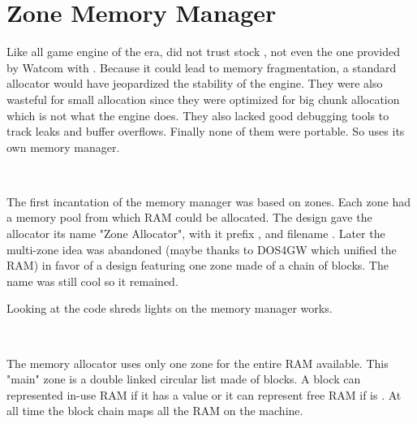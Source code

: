 \section{Zone Memory Manager}
Like all game engine of the era, \doom{} did not trust stock , not even the one provided by Watcom with . Because it could lead to memory fragmentation, a standard allocator would have jeopardized the stability of the engine. They were also wasteful for small allocation since they were optimized for big chunk allocation which is not what the engine does. They also lacked good debugging tools to track leaks and buffer overflows. Finally none of them were portable. So \doom{} uses its own memory manager.\\
\par

\\
\par
The first incantation of the memory manager was based on zones. Each zone had a memory pool from which RAM could be allocated. The design gave the allocator its name "Zone Allocator", with it prefix , and filename . Later the multi-zone idea was abandoned (maybe thanks to DOS4GW which unified the RAM) in favor of a design featuring one zone made of a chain of blocks. The  name was still cool so it remained.\\
\par
Looking at the code  shreds lights on the memory manager works.\\
\par
{}\\
\par
The memory allocator uses only one zone for the entire RAM available. This "main" zone is a double linked circular list made of blocks. A block can represented in-use RAM if it has a  value or it can represent free RAM if  is . At all time the block chain maps all the RAM on the machine.



